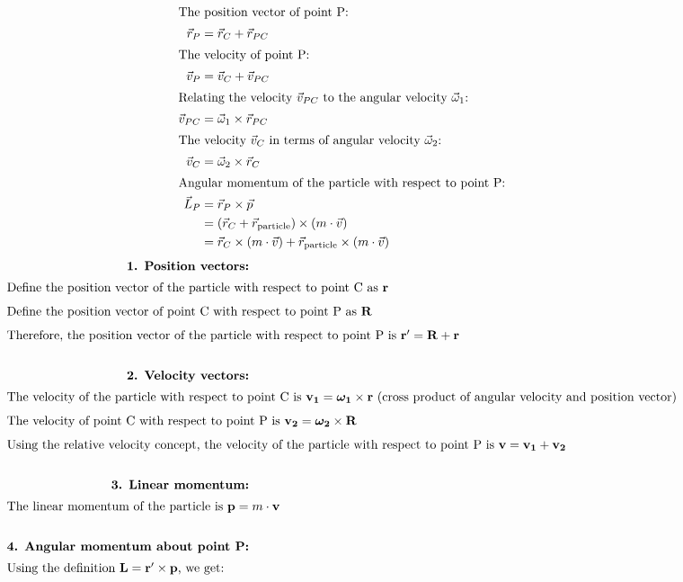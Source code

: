 \begin{solution}
    


\begin{align*}
\intertext{The position vector of point P:}
\vec{r}_P &= \vec{r}_C + \vec{r}_{PC} \\
\intertext{The velocity of point P:}
\vec{v}_P &= \vec{v}_C + \vec{v}_{PC} \\
\intertext{Relating the velocity $\vec{v}_{PC}$ to the angular velocity $\vec{\omega}_1$:}
\vec{v}_{PC} &= \vec{\omega}_1 \times \vec{r}_{PC} \\
\intertext{The velocity $\vec{v}_C$ in terms of angular velocity $\vec{\omega}_2$:}
\vec{v}_C &= \vec{\omega}_2 \times \vec{r}_C \\
\intertext{Angular momentum of the particle with respect to point P:}
\vec{L}_P &= \vec{r}_P \times \vec{p} \\
&= (\vec{r}_C + \vec{r}_{\text{particle}}) \times (m \cdot \vec{v}) \\
&= \vec{r}_C \times (m \cdot \vec{v}) + \vec{r}_{\text{particle}} \times (m \cdot \vec{v}) \\
\end{align*}
\begin{align*}
    \textbf{1. Position vectors:} \\
    \intertext{Define the position vector of the particle with respect to point C as $\mathbf{r}$}
    \intertext{Define the position vector of point C with respect to point P as $\mathbf{R}$}
    \intertext{Therefore, the position vector of the particle with respect to point P is $\mathbf{r'} = \mathbf{R} + \mathbf{r}$} \\
    \textbf{2. Velocity vectors:} \\
    \intertext{The velocity of the particle with respect to point C is $\mathbf{v_1} = \boldsymbol{\omega_1} \times \mathbf{r}$ (cross product of angular velocity and position vector)} 
    \intertext{The velocity of point C with respect to point P is $\mathbf{v_2} = \boldsymbol{\omega_2} \times \mathbf{R}$}
    \intertext{Using the relative velocity concept, the velocity of the particle with respect to point P is $\mathbf{v} = \mathbf{v_1} + \mathbf{v_2}$} \\
    \textbf{3. Linear momentum:} \\
    \intertext{The linear momentum of the particle is $\mathbf{p} = m \cdot \mathbf{v}$} \\
    \textbf{4. Angular momentum about point P:} \\
    \intertext{Using the definition $\mathbf{L} = \mathbf{r'} \times \mathbf{p}$, we get:}\\

\end{align*}
\end{solution}
